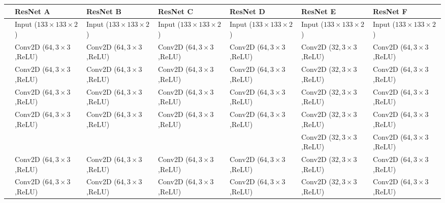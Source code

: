 \begin{table}
    \centering
    \tiny
    \begin{tabular}{l|l|l|l|l|l|l}
         \toprule
         &\textbf{ResNet A} & \textbf{ResNet B} & \textbf{ResNet C} & \textbf{ResNet D} & \textbf{ResNet E} & \textbf{ResNet F} \\
         \midrule
         
         &Input ($133\times133\times2$) & Input ($133\times133\times2$) & Input ($133\times133\times2$) & Input ($133\times133\times2$) & Input ($133\times133\times2$) & Input ($133\times133\times2$) \\
         
         &Conv2D ($64,3\times3$,ReLU) & Conv2D ($64,3\times3$,ReLU) & Conv2D ($64,3\times3$,ReLU) & Conv2D ($64,3\times3$,ReLU) & Conv2D ($32,3\times3$,ReLU) & Conv2D ($64,3\times3$,ReLU) \\
         
         &Conv2D ($64,3\times3$,ReLU) & Conv2D ($64,3\times3$,ReLU) & Conv2D ($64,3\times3$,ReLU) & Conv2D ($64,3\times3$,ReLU) & Conv2D ($32,3\times3$,ReLU) & Conv2D ($64,3\times3$,ReLU) \\
         \midrule
         
         &Conv2D ($64,3\times3$,ReLU) & Conv2D ($64,3\times3$,ReLU) & Conv2D ($64,3\times3$,ReLU) & Conv2D ($64,3\times3$,ReLU) & Conv2D ($32,3\times3$,ReLU) & Conv2D ($64,3\times3$,ReLU) \\
         
         &Conv2D ($64,3\times3$,ReLU) & Conv2D ($64,3\times3$,ReLU) & Conv2D ($64,3\times3$,ReLU) & Conv2D ($64,3\times3$,ReLU) & Conv2D ($32,3\times3$,ReLU) & Conv2D ($64,3\times3$,ReLU) \\
         
         & &  &  &  & Conv2D ($32,3\times3$,ReLU) & Conv2D ($64,3\times3$,ReLU) \\
         \midrule
         
         &Conv2D ($64,3\times3$,ReLU) & Conv2D ($64,3\times3$,ReLU) & Conv2D ($64,3\times3$,ReLU) & Conv2D ($64,3\times3$,ReLU) & Conv2D ($32,3\times3$,ReLU) & Conv2D ($64,3\times3$,ReLU) \\
         
         &Conv2D ($64,3\times3$,ReLU) & Conv2D ($64,3\times3$,ReLU) & Conv2D ($64,3\times3$,ReLU) & Conv2D ($64,3\times3$,ReLU) & Conv2D ($32,3\times3$,ReLU) & Conv2D ($64,3\times3$,ReLU) \\
         

\end{tabular}
\end{table}
